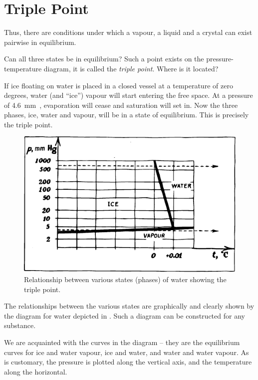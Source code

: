 \section{Triple Point}

Thus, there are conditions under which a vapour, a liquid and a crystal can exist pairwise in equilibrium.

Can all three states be in equilibrium? Such a point exists on the pressure-temperature diagram, it is called the \emph{triple point}. Where is it located?

If ice floating on water is placed in a closed vessel at a temperature of zero degrees, water (and ``ice'') vapour will start entering the free space. At a pressure of \SI{4.6}{\milli\meter\mercury}, evaporation will cease and saturation will set in. Now the three phases, ice, water and vapour, will be in a state of equilibrium. This is precisely the triple point.

\begin{figure}[!ht]
\centering
\includegraphics[width=\textwidth]{figures/fig-04-11.pdf}
\caption{Relationship between various states (phases) of water showing the triple point.}
\label{fig-4.11}
\end{figure}
The relationships between the various states are graph­ically and clearly shown by the diagram for water depict­ed in . Such a diagram can be constructed for any substance.

We are acquainted with the curves in the diagram -- they are the equilibrium curves for ice and water vapour, ice and water, and water and water vapour. As is customary, the pressure is plotted along the vertical axis, and the temperature along the horizontal.

